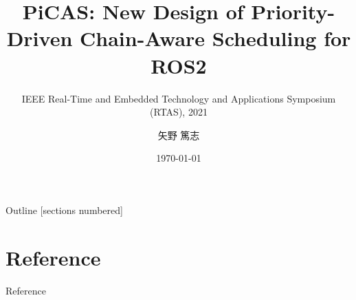 \newcommand{\beamerDir}[0]{/mnt/c/Users/atsushi/Documents/workspace/env/Beamer/beamer/beamer/}





\newcommand{\forme}[1]{}


\title{PiCAS: New Design of Priority-Driven Chain-Aware Scheduling for ROS2}
\subtitle{IEEE Real-Time and Embedded Technology and Applications Symposium (RTAS), 2021}
\author{矢野 篤志}
\date{\today}




\maketitle

% 

\begin{frame}{Outline}
    [sections numbered]
    \tiny\tableofcontents[hideallsubsections]
\end{frame}





\forme{}





\lastpage

\section*{Reference}
\begin{frame}[allowframebreaks]{Reference}
    \beamertemplatetextbibitems
    
    
\end{frame}


